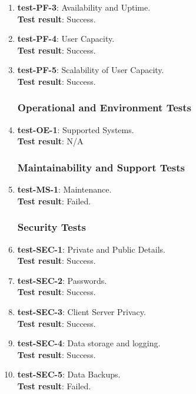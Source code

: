 \documentclass[12pt, titlepage]{article}
\begin{document}
\begin{enumerate}
	\item{\textbf{test-PF-3}}: Availability and Uptime.\\
	\textbf{Test result}: Success.
	
	\item{\textbf{test-PF-4}}: User Capacity.\\
	\textbf{Test result}: Success.
	
	\item{\textbf{test-PF-5}}: Scalability of User Capacity.\\
	\textbf{Test result}: Success.
	
\subsubsection{Operational and Environment Tests}
	\item{\textbf{test-OE-1}}: Supported Systems.\\
	\textbf{Test result}: N/A
	
\subsubsection{Maintainability and Support Tests}
	\item{\textbf{test-MS-1}}: Maintenance.\\
	\textbf{Test result}: Failed.
	
\subsubsection{Security Tests}
	\item{\textbf{test-SEC-1}}: Private and Public Details.\\
	\textbf{Test result}: Success.
	
	\item{\textbf{test-SEC-2}}: Passwords.\\
	\textbf{Test result}: Success.
	
	\item{\textbf{test-SEC-3}}: Client Server Privacy.\\
	\textbf{Test result}: Success.
	
	\item{\textbf{test-SEC-4}}: Data storage and logging.\\
	\textbf{Test result}: Success.
	
	\item{\textbf{test-SEC-5}}: Data Backups.\\
	\textbf{Test result}: Failed.
	

\end{enumerate}
\end{document}
